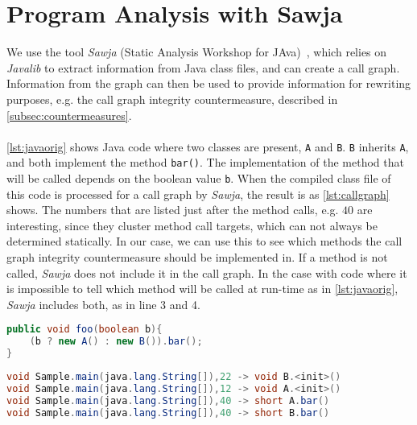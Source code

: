 \section{Program Analysis with Sawja}\label{sec:sawja}
We use the tool \textit{Sawja} (Static Analysis Workshop for JAva)~\cite{sawja}, which relies on \textit{Javalib} to extract information from Java class files, and can create a call graph. Information from the graph can then be used to provide information for rewriting purposes, e.g. the call graph integrity countermeasure, described in \cref{subsec:countermeasures}.\\\\
\cref{lst:javaorig} shows Java code where two classes are present, \texttt{A} and \texttt{B}. \texttt{B} inherits \texttt{A}, and both implement the method \texttt{bar()}. The implementation of the method that will be called depends on the boolean value \texttt{b}. When the compiled class file of this code is processed for a call graph by \textit{Sawja}, the result is as \cref{lst:callgraph} shows. The numbers that are listed just after the method calls, e.g. $40$ are interesting, since they cluster method call targets, which can not always be determined statically. In our case, we can use this to see which methods the call graph integrity countermeasure should be implemented in. If a method is not called, \textit{Sawja} does not include it in the call graph.
In the case with code where it is impossible to tell which method will be called at run-time as in \cref{lst:javaorig}, \textit{Sawja} includes both, as in line 3 and 4.

\begin{minipage}{\linewidth}
\begin{lstlisting}[caption=Java sample.,language=Java,label=lst:javaorig]
public void foo(boolean b){
    (b ? new A() : new B()).bar();
}
\end{lstlisting}
\end{minipage}

\begin{minipage}{\linewidth} %
\begin{lstlisting}[caption=Call graph generated by \textit{Sawja}.,language=Java,label=lst:callgraph]
void Sample.main(java.lang.String[]),22 -> void B.<init>()
void Sample.main(java.lang.String[]),12 -> void A.<init>()
void Sample.main(java.lang.String[]),40 -> short A.bar()
void Sample.main(java.lang.String[]),40 -> short B.bar()
\end{lstlisting}
\end{minipage}


